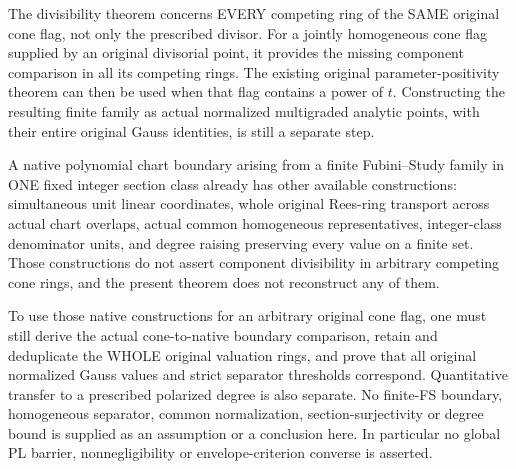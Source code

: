 \begin{remark}
The divisibility theorem concerns EVERY competing ring of the SAME
original cone flag, not only the prescribed divisor. For a jointly
homogeneous cone flag supplied by an original divisorial point, it
provides the missing component comparison in all its competing rings.
The existing original parameter-positivity theorem can then be used
when that flag contains a power of $t$. Constructing the resulting
finite family as actual normalized multigraded analytic points, with
their entire original Gauss identities, is still a separate step.

A native polynomial chart boundary arising from a finite
Fubini--Study family in ONE fixed integer section class already has
other available constructions: simultaneous unit linear coordinates,
whole original Rees-ring transport across actual chart overlaps,
actual common homogeneous representatives, integer-class denominator
units, and degree raising preserving every value on a finite set.
Those constructions do not assert component divisibility in arbitrary
competing cone rings, and the present theorem does not reconstruct
any of them.

To use those native constructions for an arbitrary original cone
flag, one must still derive the actual cone-to-native boundary
comparison, retain and deduplicate the WHOLE original valuation rings,
and prove that all original normalized Gauss values and strict
separator thresholds correspond. Quantitative transfer to a prescribed
polarized degree is also separate. No finite-FS boundary, homogeneous
separator, common normalization, section-surjectivity or degree bound
is supplied as an assumption or a conclusion here. In particular no
global PL barrier, nonnegligibility or envelope-criterion converse is
asserted.
\end{remark}
